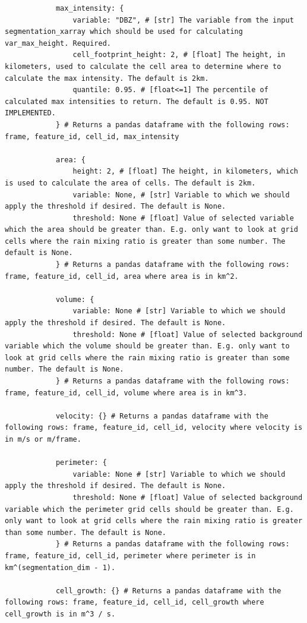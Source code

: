 \documentclass[10pt,a4paper]{article}
\begin{document}
\begin{lstlisting}
			max_intensity: {
				variable: "DBZ", # [str] The variable from the input segmentation_xarray which should be used for calculating var_max_height. Required.	
				cell_footprint_height: 2, # [float] The height, in kilometers, used to calculate the cell area to determine where to calculate the max intensity. The default is 2km.
				quantile: 0.95. # [float<=1] The percentile of calculated max intensities to return. The default is 0.95. NOT IMPLEMENTED.
			} # Returns a pandas dataframe with the following rows: frame, feature_id, cell_id, max_intensity
		
			area: {
				height: 2, # [float] The height, in kilometers, which is used to calculate the area of cells. The default is 2km.
				variable: None, # [str] Variable to which we should apply the threshold if desired. The default is None.
				threshold: None # [float] Value of selected variable which the area should be greater than. E.g. only want to look at grid cells where the rain mixing ratio is greater than some number. The default is None.
			} # Returns a pandas dataframe with the following rows: frame, feature_id, cell_id, area where area is in km^2.
		
			volume: {
				variable: None # [str] Variable to which we should apply the threshold if desired. The default is None.
				threshold: None # [float] Value of selected background variable which the volume should be greater than. E.g. only want to look at grid cells where the rain mixing ratio is greater than some number. The default is None.
			} # Returns a pandas dataframe with the following rows: frame, feature_id, cell_id, volume where area is in km^3.
		
			velocity: {} # Returns a pandas dataframe with the following rows: frame, feature_id, cell_id, velocity where velocity is in m/s or m/frame.
			
			perimeter: {
				variable: None # [str] Variable to which we should apply the threshold if desired. The default is None.
				threshold: None # [float] Value of selected background variable which the perimeter grid cells should be greater than. E.g. only want to look at grid cells where the rain mixing ratio is greater than some number. The default is None.
			} # Returns a pandas dataframe with the following rows: frame, feature_id, cell_id, perimeter where perimeter is in km^(segmentation_dim - 1).
		
			cell_growth: {} # Returns a pandas dataframe with the following rows: frame, feature_id, cell_id, cell_growth where cell_growth is in m^3 / s.
			

\end{lstlisting}
\end{document}
